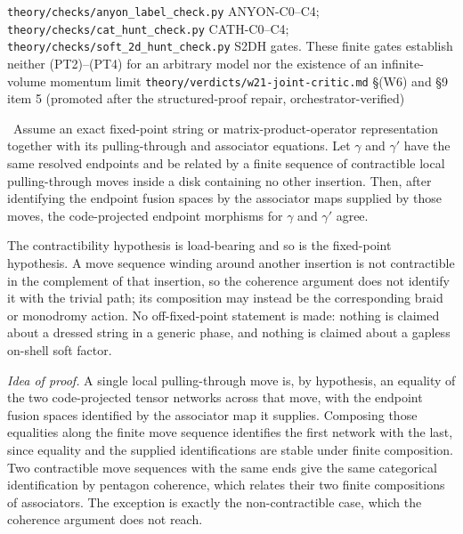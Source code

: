 %
{\texttt{theory/checks/anyon\_label\_check.py} ANYON-C0--C4;
\texttt{theory/checks/cat\_hunt\_check.py} CATH-C0--C4;
\texttt{theory/checks/soft\_2d\_hunt\_check.py} S2DH gates. These finite gates
establish neither (PT2)--(PT4) for an arbitrary model nor the existence of an
infinite-volume momentum limit}%
{\texttt{theory/verdicts/w21-joint-critic.md} \S(W6) and \S9 item 5
(promoted after the structured-proof repair, orchestrator-verified)}

\begin{theorem}\label{thm:isotopy-flat}
\statusProvedConditional\ Assume an exact fixed-point string or
matrix-product-operator representation together with its pulling-through and
associator equations. Let $\gamma$ and $\gamma'$ have the same resolved
endpoints and be related by a finite sequence of contractible local
pulling-through moves inside a disk containing no other insertion. Then, after
identifying the endpoint fusion spaces by the associator maps supplied by
those moves, the code-projected endpoint morphisms for $\gamma$ and $\gamma'$
agree.
\end{theorem}

\begin{scope}
The contractibility hypothesis is load-bearing and so is the fixed-point
hypothesis. A move sequence winding around another insertion is not
contractible in the complement of that insertion, so the coherence argument
does not identify it with the trivial path; its composition may instead be the
corresponding braid or monodromy action. No off-fixed-point statement is made:
nothing is claimed about a dressed string in a generic phase, and nothing is
claimed about a gapless on-shell soft factor.
\end{scope}

\emph{Idea of proof.} A single local pulling-through move is, by hypothesis, an
equality of the two code-projected tensor networks across that move, with the
endpoint fusion spaces identified by the associator map it supplies.
Composing those equalities along the finite move sequence identifies the first
network with the last, since equality and the supplied identifications are
stable under finite composition. Two contractible move sequences with the same
ends give the same categorical identification by pentagon coherence, which
relates their two finite compositions of associators. The exception is exactly
the non-contractible case, which the coherence argument does not reach.

